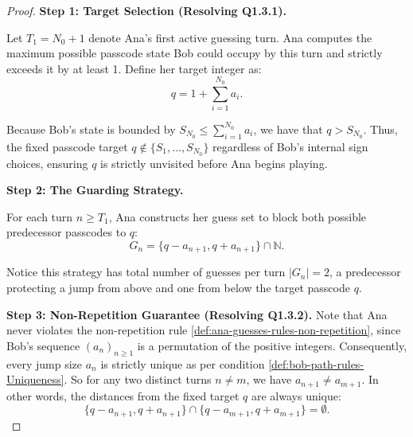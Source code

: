 \begin{proof}

\textbf{Step 1: Target Selection (Resolving Q1.3.1).}

\noindent
Let $T_1 = N_0 + 1$ denote Ana's first active guessing turn. Ana computes the maximum possible passcode state Bob could occupy by this turn and strictly exceeds it by at least 1. Define her target integer as:
$$q = 1 + \sum_{i=1}^{N_0} a_i.$$

Because Bob's state is bounded by $S_{N_0} \le \sum_{i=1}^{N_0} a_i$, we have that $q > S_{N_0}$. Thus, the fixed passcode target $q \notin \{S_1, \dots, S_{N_0}\}$ regardless of Bob's internal sign choices, ensuring $q$ is strictly unvisited before Ana begins playing.


\textbf{Step 2: The Guarding Strategy.} 

\noindent
For each turn $n \ge T_1$, Ana constructs her guess set to block both possible predecessor passcodes to $q$:
$$G_n = \{q - a_{n+1}, q + a_{n+1}\} \cap \mathbb{N}.$$ 

\noindent
Notice this strategy has total number of guesses per turn  $|G_n| = 2$, a predecessor protecting a jump from above and one from below the target passcode $q$. 




\textbf{Step 3: Non-Repetition Guarantee (Resolving Q1.3.2).} 
Note that Ana never violates the non-repetition rule \ref{def:ana-guesses-rules-non-repetition}, since Bob's sequence $(a_n)_{n \ge 1}$ is a permutation of the positive integers. Consequently, every jump size $a_n$ is strictly unique as per condition \ref{def:bob-path-rules-Uniqueness}. So for any two distinct turns $n \neq m$, we have $a_{n+1} \neq a_{m+1}$. In other words, the distances from the fixed target $q$ are always unique:
$$\{q - a_{n+1}, q + a_{n+1}\} \cap \{q - a_{m+1}, q + a_{m+1}\} = \emptyset.$$


\end{proof}
